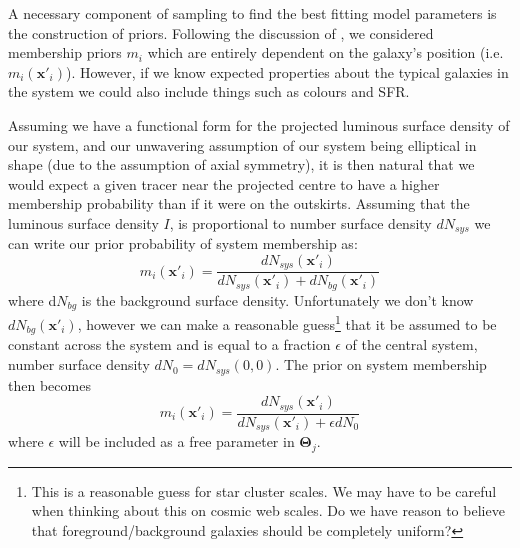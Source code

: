 A necessary component of sampling to find the best fitting model parameters is the construction of priors. Following the discussion of \citet{watkins2013}, we considered membership priors $m_i$ which are entirely dependent on the galaxy's position (i.e. $m_{i}(\boldsymbol{x}'_{i})$). However, if we know expected properties about the typical galaxies in the system we could also include things such as colours and SFR. 

Assuming we have a functional form for the projected luminous surface density of our system, and our unwavering assumption of our system being elliptical in shape (due to the assumption of axial symmetry), it is then natural that we would expect a given tracer near the projected centre to have a higher membership probability than if it were on the outskirts. Assuming that the luminous surface density $I$, is proportional to number surface density $dN_{sys}$ we can write our prior probability of system membership as:
\begin{equation}
m_{i}(\boldsymbol{x}'_{i}) = \frac{dN_{sys}(\boldsymbol{x}'_{i})}{dN_{sys}(\boldsymbol{x}'_{i}) + dN_{bg}(\boldsymbol{x}'_{i})}
\end{equation}
where d$N_{bg}$ is the background surface density. Unfortunately we don't know $dN_{bg}(\boldsymbol{x}'_{i})$, however we can make a reasonable guess\footnote{This is a reasonable guess for star cluster scales. We may have to be careful when thinking about this on cosmic web scales. Do we have reason to believe that foreground/background galaxies should be completely uniform?} that it be assumed to be constant across the system and is equal to a fraction $\epsilon$ of the central system, number surface density $dN_{0} = dN_{sys}(0,0)$. The prior on system membership then becomes
\begin{equation}
m_{i}(\boldsymbol{x}'_{i}) = \frac{dN_{sys}(\boldsymbol{x}'_{i})}{dN_{sys}(\boldsymbol{x}'_{i}) + \epsilon dN_{0}}
\end{equation}
where $\epsilon$ will be included as a free parameter in $\boldsymbol{\Theta}_{j}$.

